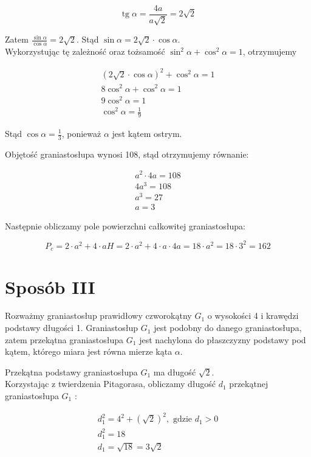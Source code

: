 \documentclass[10pt]{article}
\begin{document}
$$
\operatorname{tg} \alpha=\frac{4 a}{a \sqrt{2}}=2 \sqrt{2}
$$

Zatem $\frac{\sin \alpha}{\cos \alpha}=2 \sqrt{2}$. Stąd $\sin \alpha=2 \sqrt{2} \cdot \cos \alpha$.\\
Wykorzystując tę zależność oraz tożsamość $\sin ^{2} \alpha+\cos ^{2} \alpha=1$, otrzymujemy

$$
\begin{gathered}
(2 \sqrt{2} \cdot \cos \alpha)^{2}+\cos ^{2} \alpha=1 \\
8 \cos ^{2} \alpha+\cos ^{2} \alpha=1 \\
9 \cos ^{2} \alpha=1 \\
\cos ^{2} \alpha=\frac{1}{9}
\end{gathered}
$$

Stąd $\cos \alpha=\frac{1}{3}$, ponieważ $\alpha$ jest kątem ostrym.

Objętość graniastosłupa wynosi 108, stąd otrzymujemy równanie:

$$
\begin{gathered}
a^{2} \cdot 4 a=108 \\
4 a^{3}=108 \\
a^{3}=27 \\
a=3
\end{gathered}
$$

Następnie obliczamy pole powierzchni całkowitej graniastosłupa:

$$
P_{c}=2 \cdot a^{2}+4 \cdot a H=2 \cdot a^{2}+4 \cdot a \cdot 4 a=18 \cdot a^{2}=18 \cdot 3^{2}=162
$$

\section*{Sposób III}
Rozważmy graniastosłup prawidłowy czworokątny $G_{1}$ o wysokości 4 i krawędzi podstawy długości 1. Graniastosłup $G_{1}$ jest podobny do danego graniastosłupa, zatem przekątna graniastosłupa $G_{1}$ jest nachylona do płaszczyzny podstawy pod kątem, którego miara jest równa mierze kąta $\alpha$.

Przekątna podstawy graniastosłupa $G_{1}$ ma długość $\sqrt{2}$.\\
Korzystając z twierdzenia Pitagorasa, obliczamy długość $d_{1}$ przekątnej graniastosłupa $G_{1}$ :

$$
\begin{gathered}
d_{1}^{2}=4^{2}+(\sqrt{2})^{2}, \text { gdzie } d_{1}>0 \\
d_{1}^{2}=18 \\
d_{1}=\sqrt{18}=3 \sqrt{2}
\end{gathered}
$$
\end{document}
